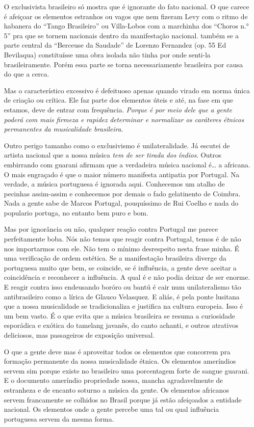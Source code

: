 O exclusivista brasileiro só mostra que é ignorante do fato nacional. O
que carece é afeiçoar os elementos estranhos ou vagos que nem fizeram
Levy com o ritmo de habanera do ``Tango Brasileiro'' ou Villa-Lobos com a
marchinha dos ``Choros n.° 5'' pra que se tornem nacionais dentro da
manifestação nacional. também se a parte central da ``Berceuse da
Saudade'' de Lorenzo Fernandez (op. 55 Ed Bevilaqua) constituísse uma
obra isolada não tinha por onde senti-la brasileiramente. Porém essa
parte se torna necessariamente brasileira por causa do que a cerca.

Mas o característico excessivo é defeituoso apenas quando virado em
norma única de criação ou crítica. Ele faz parte dos elementos úteis e
até, na fase em que estamos, deve de entrar com frequência. \emph{Porque
é por meio dele que a gente poderá com mais firmeza e rapidez determinar
e normalizar os caráteres étnicos permanentes da musicalidade
brasileira.}

Outro perigo tamanho como o exclusivismo é unilateralidade. Já escutei
de artista nacional que a nossa música \emph{tem de ser tirada dos
índios}. Outros embirrando com guarani afirmam que a verdadeira música
nacional é\ldots{} a africana. O mais engraçado é que o maior número
manifesta antipatia por Portugal. Na verdade, a música portuguesa é
ignorada aqui. Conhecemos um atalho de pecinhas assim-assim e conhecemos
por demais o fado gelatinento de Coimbra. Nada a gente sabe de Marcos
Portugal, pouquíssimo de Rui Coelho e nada do populario portuga, no
entanto bem puro e bom.

Mas por ignorância ou não, qualquer reação contra Portugal me parece
perfeitamente boba. Nós não temos que reagir contra Portugal, temos é de
não nos importarmos com ele. Não tem o mínimo desrespeito nesta frase
minha. É uma verificação de ordem estética. Se a manifestação brasileira
diverge da portuguesa muito que bem, se coincide, se é influência, a
gente deve aceitar a coincidência e reconhecer a influência. A qual é e
não podia deixar de ser enorme. E reagir contra isso endeusando boróro
ou bantú é cair num unilateralismo tão antibrasileiro como a lírica de
Glauco Velasquez. E aliás, é pela ponte lusitana que a nossa
musicalidade se tradicionaliza e justifica na cultura europeia. Isso é
um bem vasto. É o que evita que a música brasileira se resuma a
curiosidade esporádica e exótica do tamelang javanês, do canto achanti,
e outros atrativos deliciosos, mas passageiros de exposição universal.

O que a gente deve mas é aproveitar todos os elementos que concorrem pra
formação permanente da nossa musicalidade étnica. Os elementos
ameríndios servem sim porque existe no brasileiro uma porcentagem forte
de sangue guarani. E o documento ameríndio propriedade nossa, mancha
agradavelmente de estranheza e de encanto soturno a música da gente. Os
elementos africanos servem francamente se colhidos no Brasil porque já
estão afeiçoados a entidade nacional. Os elementos onde a gente percebe
uma tal ou qual influência portuguesa servem da mesma forma.

